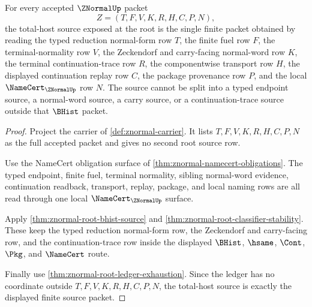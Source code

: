 \begin{theorem}
\label{thm:znormal-root-total-host-source}
For every accepted $\ZNormalUp$ packet
$$
Z=(T,F,V,K,R,H,C,P,N),
$$
the total-host source exposed at the root is the single finite packet obtained by reading the typed reduction normal-form row $T$, the finite fuel row $F$, the terminal-normality row $V$, the Zeckendorf and carry-facing normal-word row $K$, the terminal continuation-trace row $R$, the componentwise transport row $H$, the displayed continuation replay row $C$, the package provenance row $P$, and the local $\NameCert_{\ZNormalUp}$ row $N$. The source cannot be split into a typed endpoint source, a normal-word source, a carry source, or a continuation-trace source outside that $\BHist$ packet.
\end{theorem}
\begin{proof}
Project the carrier of \autoref{def:znormal-carrier}. It lists $T,F,V,K,R,H,C,P,N$ as the full accepted packet and gives no second root source row.

Use the NameCert obligation surface of \autoref{thm:znormal-namecert-obligations}. The typed endpoint, finite fuel, terminal normality, sibling normal-word evidence, continuation readback, transport, replay, package, and local naming rows are all read through one local $\NameCert_{\ZNormalUp}$ surface.

Apply \autoref{thm:znormal-root-bhist-source} and \autoref{thm:znormal-root-classifier-stability}. These keep the typed reduction normal-form row, the Zeckendorf and carry-facing row, and the continuation-trace row inside the displayed $\BHist$, $\hsame$, $\Cont$, $\Pkg$, and $\NameCert$ route.

Finally use \autoref{thm:znormal-root-ledger-exhaustion}. Since the ledger has no coordinate outside $T,F,V,K,R,H,C,P,N$, the total-host source is exactly the displayed finite source packet.
\end{proof}

